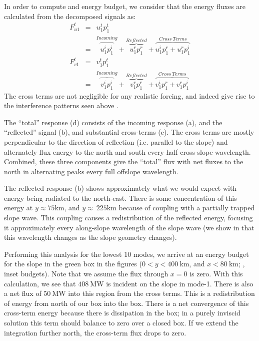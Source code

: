 \documentclass[12pt]{article}
\begin{document}
In order to compute and energy budget, we consider that the energy fluxes are calculated from the decomposed signals as:
\begin{eqnarray}
  F_{u1}^t & = & u_1^t p_1^t \\
  &= & \overbrace{u_1^ip_1^i}^{Incoming} + \overbrace{u_1^rp_1^r}^{Reflected} + 
  \overbrace{u_1^ip_1^r + u_1^rp_1^i}^{Cross\ Terms} \\
  F_{v1}^t & = & v_1^t p_1^t \\
  &= & \overbrace{v_1^ip_1^i}^{Incoming} + \overbrace{v_1^rp_1^r}^{Reflected} + 
  \overbrace{v_1^ip_1^r + v_1^rp_1^i}^{Cross\ Terms} 
\end{eqnarray}
The cross terms are not negligible for any realistic forcing, and indeed give rise to the interference patterns seen above \citep{nashetal04a,martinietal07}. 

The ``total'' response (d) consists of the incoming response (a), and the ``reflected'' signal (b), and substantial cross-terms (c).  The cross terms are mostly perpendicular to the direction of reflection (i.e. parallel to the slope) and alternately flux energy to the north and south every half cross-slope wavelength.  Combined, these three components give the ``total'' flux with net fluxes to the north in alternating peaks every full offslope wavelength.  

The reflected response (b) shows approximately what we would expect with energy being radiated to the north-east.  There is some concentration of this energy at $y\approx \mathrm{75 km}$, and  $y\approx\ \mathrm{225 km}$ because of coupling with a partially trapped slope wave.  This coupling causes a redistribution of the reflected energy, focusing it approximately every along-slope wavelength of the slope wave (we show in  that this wavelength changes as the slope geometry changes).  

Performing this analysis for the lowest 10 modes, we arrive at an energy budget for the slope in the green box in the figures ($0<y<400\ \mathrm{km}$, and $x<80\ \mathrm{km}$; , inset budgets).   Note that we assume the flux through $x=0$ is zero.   With this calculation, we see that $408\ \mathrm{MW}$ is incident on the slope in mode-1.  There is also a net flux  of $50\ \mathrm{MW}$ into this region from the cross terms.  This is a redistribution of energy from north of our box into the box.  There is a net convergence of this cross-term energy because there is dissipation in the box; in a purely inviscid solution this term should balance to zero over a closed box.  If we extend the integration further north, the cross-term flux drops to zero.  
\end{document}
